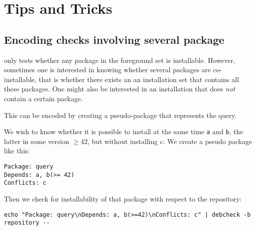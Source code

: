 
\section{Tips and Tricks}
\label{sec:tricks}
\subsection{Encoding checks involving several package}
\debcheck{} only tests whether any package in the foreground set is
installable. However, sometimes one is interested in knowing whether
several packages are co-installable, that is whether there exists an
an installation set that contains all these packages. One might also
be interested in an installation that does \emph{not} contain a certain
package.

This can be encoded by creating a pseudo-package that
represents the query. 

\begin{example}
  We wish to know whether it is possible to install at the same time
  \texttt{a} and \texttt{b}, the latter in some version $\geq 42$, but
  without installing c. We create a pseudo package like this:
\begin{verbatim}
Package: query
Depends: a, b(>= 42)
Conflicts: c
\end{verbatim}
Then we check for installability of that package with respect to the
repository:
\begin{verbatim}
echo "Package: query\nDepends: a, b(>=42)\nConflicts: c" | debcheck -b repository --
\end{verbatim}
\end{example}



